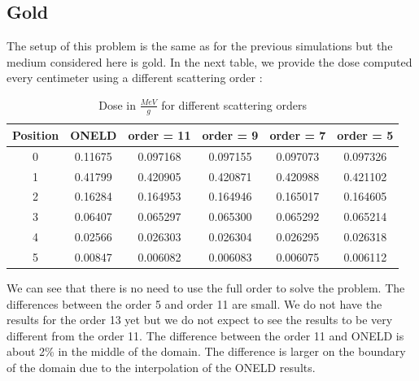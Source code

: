 \subsection{Gold}
The setup of this problem is the same as for the previous simulations but the
medium considered here is gold. In the next table, we provide the dose computed every centimeter 
using a different scattering order :
\begin{table}[H]
\begin{center}
\caption{Dose in $\frac{MeV}{g}$ for different scattering orders}
\begin{tabular}{|c|c|c|c|c|c|}
\hline
Position & ONELD &  order = 11 & order = 9 & order = 7 & order = 5 \\
\hline
0 & 0.11675 & 0.097168 & 0.097155 & 0.097073 & 0.097326 \\
1 & 0.41799 & 0.420905 & 0.420871 & 0.420988 & 0.421102 \\
2 & 0.16284 & 0.164953 & 0.164946 & 0.165017 & 0.164605 \\
3 & 0.06407 & 0.065297 & 0.065300 & 0.065292 & 0.065214 \\
4 & 0.02566 & 0.026303 & 0.026304 & 0.026295 & 0.026318 \\
5 & 0.00847 & 0.006082 & 0.006083 & 0.006075 & 0.006112 \\
\hline
\end{tabular}
\end{center}
\end{table}                
We can see that there is no need to use the full order to solve the problem.
The differences between the order 5 and order 11 are small. We do not have the
results for the order 13 yet but we do not expect to see the results to be
very different from the order 11. The difference between the order 11 and ONELD
is about 2\% in the middle of the domain. The difference is larger on the
boundary of the domain due to the interpolation of the ONELD results.

